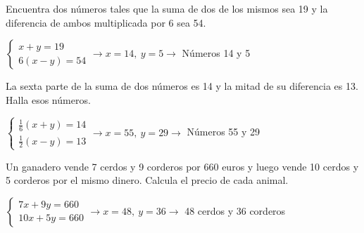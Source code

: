 \documentclass[spanish, 12pt]{exam}
\begin{document}
\begin{questions}
\begin{multicols}{2}
\end{multicols}


\question Encuentra dos números tales que la suma de dos de los mismos sea 19 y la diferencia de ambos multiplicada por 6 sea 54.
\begin{solution} $\left\{\begin{matrix}x+y=19 \\ 6(x-y)=54\end{matrix}\right. \to  x = 14, \  y = 5 \to$ Números 14 y 5 \end{solution}

\question La sexta parte de la suma de dos números es 14 y la mitad de su diferencia es 13. Halla esos números.
\begin{solution} $\left\{\begin{matrix}\frac{1}{6}(x+y)=14 \\ \frac{1}{2}(x-y)=13\end{matrix}\right. \to  x = 55, \  y = 29 \to$ Números 55 y 29 \end{solution}

\question Un ganadero vende 7 cerdos y 9 corderos por 660 euros y luego vende 10 cerdos y 5 corderos por el mismo dinero. Calcula el precio de cada animal.
\begin{solution} $\left\{\begin{matrix}7x+9y=660 \\ 10x+5y=660\end{matrix}\right. \to  x = 48, \  y = 36 \to$ 48 cerdos y 36 corderos \end{solution}


\end{questions}
\end{document}
